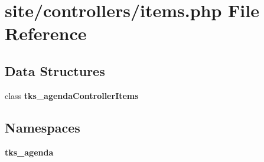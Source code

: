 \section{site/controllers/items.php File Reference}
\label{site_2controllers_2items_8php}
\subsection*{Data Structures}
\begin{DoxyCompactItemize}
\item 
class \textbf{ tks\+\_\+agenda\+Controller\+Items}
\end{DoxyCompactItemize}
\subsection*{Namespaces}
\begin{DoxyCompactItemize}
\item 
 \textbf{ tks\+\_\+agenda}
\end{DoxyCompactItemize}
